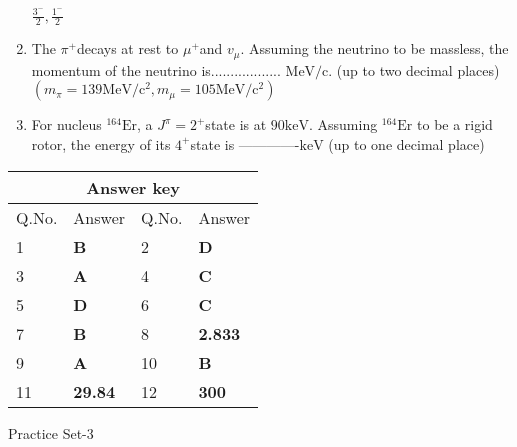\begin{enumerate}
\begin{tasks}
		\task[\textbf{D.}] $\frac{3^{-}}{2}, \frac{1^{-}}{2}$
	\end{tasks}
	\item The $\pi^{+}$decays at rest to $\mu^{+}$and $v_{\mu}$. Assuming the neutrino to be massless, the momentum of the neutrino is.................. $\mathrm{MeV} / \mathrm{c}$. (up to two decimal places)\\ $\left(m_{\pi}=139 \mathrm{MeV} / \mathrm{c}^{2}, m_{\mu}=105 \mathrm{MeV} / \mathrm{c}^{2}\right)$
	{}
	\item For nucleus ${ }^{164} \mathrm{Er}$, a $J^{\pi}=2^{+}$state is at $90 \mathrm{keV}$. Assuming ${ }^{164} \mathrm{Er}$ to be a rigid rotor, the energy of its $4^{+}$state is -------------$\mathrm{keV}$ (up to one decimal place)
	{}
\end{enumerate}
\setlength\arrayrulewidth{1pt}
\begin{table}[H]
	\centering
	\begin{tabular}{|p{1.5cm}|p{1.5cm}||p{1.5cm}|p{1.5cm}|}
		\hline
		\multicolumn{4}{|c|}{\textbf{Answer key}}\\\hline\hline
		\rowcolor{ocrel}Q.No.&Answer&Q.No.&Answer\\\hline
		1&\textbf{B} &2&\textbf{D}\\\hline 
		3&\textbf{A} &4&\textbf{C} \\\hline
		5&\textbf{D} &6&\textbf{C} \\\hline
		7&\textbf{B}&8&\textbf{2.833}\\\hline
		9&\textbf{A}&10&\textbf{B}\\\hline
		11&\textbf{29.84} &12&\textbf{300}\\\hline
	\end{tabular}
\end{table}


\newpage

\begin{abox}
	Practice Set-3
 \end{abox}


